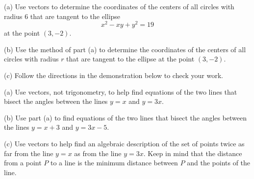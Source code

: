 \documentclass{ximera}
\begin{document}
\begin{question} \label{Q4df8240:Vectors}
(a) Use vectors to determine the coordinates of the centers of all circles with radius 6 that are tangent to the ellipse
\[
    x^2 - xy + y^2 = 19
\]
at the point $(3,-2)$.

(b) Use the method of part (a) to determine the coordinates of the centers of all circles with radius $r$ that are tangent to the ellipse at the point $(3,-2)$.

(c) Follow the directions in the demonstration below to check your work.

 
\begin{onlineOnly}
    \begin{center}
\end{center}
\end{onlineOnly}

\end{question}


\begin{question}   \label{Q6547:Vectors}
(a) Use vectors, not trigonometry, to help find equations of the two lines that bisect the angles between the lines $y=x$ and $y=3x$.

(b) Use part (a) to find equations of the two lines that bisect the angles between the lines $y=x+3$ and $y=3x-5$.


(c) Use vectors to help find an algebraic description of the set of points twice as far from the line $y=x$ as from the line $y=3x$. Keep in mind that the distance from a point $P$ to a line is the minimum distance between $P$ and the points of the line. 

\end{question}
\end{document}
